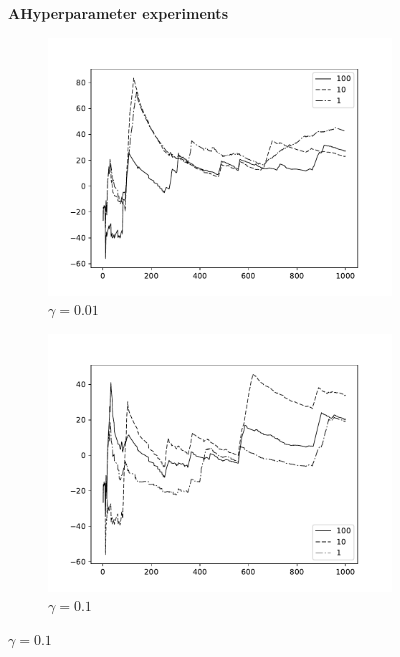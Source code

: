 \documentclass[11pt,a4paper]{article}
\begin{document}
\clearpage
\begin{figure}
\centering
\textbf{A}\quad\textbf{Hyperparameter experiments}
\begin{subfigure}{\linewidth}
    \includegraphics[width=\linewidth]{images/likelihoods-lmbda001.pdf}
    \caption{$\gamma = 0.01$}
    \label{fig:gamma001}
\end{subfigure}
\begin{subfigure}{\linewidth}
    \includegraphics[width=\linewidth]{images/likelihoods-lmbda01.pdf}
    \caption{$\gamma = 0.1$}

\end{subfigure}
\end{figure}
\end{document}
